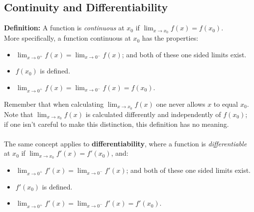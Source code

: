 \documentclass{report}
\begin{document}
\newpage
\subsection{Continuity and Differentiability} %
\textbf{Definition:} A function is \textit{continuous} at $x_0$ if $\lim_{x\to x_0}f(x)=f(x_0)$.\\
More specifically, a function continuous at $x_0$ has the properties:
\begin{itemize}
\item $\lim_{x\to 0^+}f(x)=\lim_{x\to 0^-}f(x)$; and both of these one sided limits exist. 
\item $f(x_0)$ is defined.
\item $\lim_{x\to 0^+}f(x)=\lim_{x\to 0^-}f(x)=f(x_0)$.
\end{itemize}
Remember that when calculating $\lim_{x\to x_0}f(x)$ one never allows
$x$ to equal $x_0$. Note that $\lim_{x\to x_0}f(x)$ is calculated differently and independently
of $f(x_0)$; if one isn't careful to make this distinction, this definition has no meaning.\\
\vspace{2mm}\\
The same concept applies to \textbf{differentiability}, where a function is
\textit{differentiable} at $x_0$ if $\lim_{x\to x_0}f'(x)=f'(x_0)$, and:
\begin{itemize}
\item $\lim_{x\to 0^+}f'(x)=\lim_{x\to 0^-}f'(x)$; and both of these one sided limits exist. 
\item $f'(x_0)$ is defined.
\item $\lim_{x\to 0^+}f'(x)=\lim_{x\to 0^-}f'(x)=f'(x_0)$.
\end{itemize}
\end{document}
